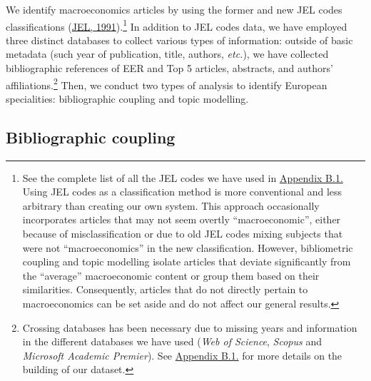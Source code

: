 \documentclass[
  12pt,
  onecolumn]{article}
\begin{document}
We identify macroeconomics articles by using the former and new JEL
codes classifications (\protect\hyperlink{ref-jel1991}{JEL,
1991}).\footnote{See the complete list of all the JEL codes we have used
  in \protect\hyperlink{eer-top5-macro}{Appendix B.1.} Using JEL codes
  as a classification method is more conventional and less arbitrary
  than creating our own system. This approach occasionally incorporates
  articles that may not seem overtly ``macroeconomic'', either because
  of misclassification or due to old JEL codes mixing subjects that were
  not ``macroeconomics'' in the new classification. However,
  bibliometric coupling and topic modelling isolate articles that
  deviate significantly from the ``average'' macroeconomic content or
  group them based on their similarities. Consequently, articles that do
  not directly pertain to macroeconomics can be set aside and do not
  affect our general results.} In addition to JEL codes data, we have
employed three distinct databases to collect various types of
information: outside of basic metadata (such year of publication, title,
authors, \emph{etc.}), we have collected bibliographic references of EER
and Top 5 articles, abstracts, and authors' affiliations.\footnote{Crossing
  databases has been necessary due to missing years and information in
  the different databases we have used (\emph{Web of Science},
  \emph{Scopus} and \emph{Microsoft Academic Premier}). See
  \protect\hyperlink{corpus}{Appendix B.1.} for more details on the
  building of our dataset.} Then, we conduct two types of analysis to
identify European specialities: bibliographic coupling and topic
modelling.

\hypertarget{bibliographic-coupling}{%
\subsection{Bibliographic coupling}\label{bibliographic-coupling}}
\end{document}

